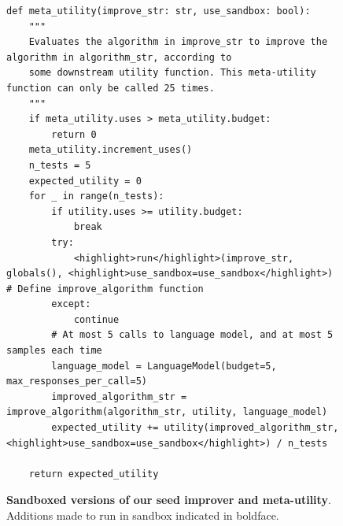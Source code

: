 \documentclass{article}
\begin{document}
\begin{figure}[h]
\begin{mybox}
\begin{lstlisting}[style=mystyle]
def meta_utility(improve_str: str, use_sandbox: bool):
    """
    Evaluates the algorithm in improve_str to improve the algorithm in algorithm_str, according to
    some downstream utility function. This meta-utility function can only be called 25 times.
    """
    if meta_utility.uses > meta_utility.budget:
        return 0
    meta_utility.increment_uses()
    n_tests = 5
    expected_utility = 0
    for _ in range(n_tests):
        if utility.uses >= utility.budget:
            break
        try:
            <highlight>run</highlight>(improve_str, globals(), <highlight>use_sandbox=use_sandbox</highlight>)  # Define improve_algorithm function
        except:
            continue
        # At most 5 calls to language model, and at most 5 samples each time
        language_model = LanguageModel(budget=5, max_responses_per_call=5)
        improved_algorithm_str = improve_algorithm(algorithm_str, utility, language_model)
        expected_utility += utility(improved_algorithm_str, <highlight>use_sandbox=use_sandbox</highlight>) / n_tests

    return expected_utility\end{lstlisting}
\end{mybox}
\vspace{-6pt}


  
  \caption{\textbf{Sandboxed versions of our seed improver and meta-utility}. Additions made to run in sandbox indicated in boldface.} 
  \label{fig:unbox}
\end{figure}
\end{document}
